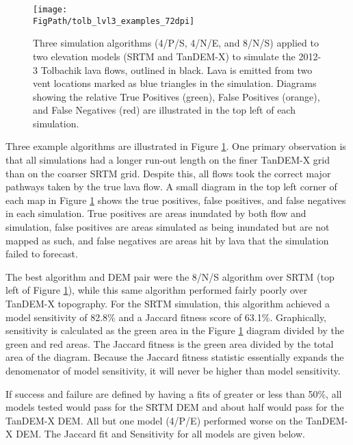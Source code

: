 	\begin{figure}[!h]
			\centering
			\texttt{[image: \\FigPath/tolb\_lvl3\_examples\_72dpi]}
			\caption[Three transition function algorithms simulating the 2012-3 Tolbachik lava flows]{Three simulation algorithms (4/P/S, 4/N/E, and 8/N/S) applied to two elevation models (SRTM and TanDEM-X) to simulate the 2012-3 Tolbachik lava flows, outlined in black. Lava is emitted from two vent locations marked as blue triangles in the simulation. Diagrams showing the relative True Positives (green), False Positives (orange), and False Negatives (red) are illustrated in the top left of each simulation.}
			\label{fig:tolbachik}
		\end{figure}
	
	Three example algorithms are illustrated in Figure \ref{fig:tolbachik}. One primary observation is that all simulations had a longer run-out length on the finer TanDEM-X grid than on the coarser SRTM grid. Despite this, all flows took the correct major pathways taken by the true lava flow. A small diagram in the top left corner of each map in Figure \ref{fig:tolbachik} shows the true positives, false positives, and false negatives in each simulation. True positives are areas inundated by both flow and simulation, false positives are areas simulated as being inundated but are not mapped as such, and false negatives are areas hit by lava that the simulation failed to forecast. 
		
			The best algorithm and DEM pair were the 8/N/S algorithm over SRTM (top left of Figure \ref{fig:tolbachik}), while this same algorithm performed fairly poorly over TanDEM-X topography. For the SRTM simulation, this algorithm achieved a model sensitivity of 82.8\% and a Jaccard fitness score of 63.1\%. Graphically, sensitivity is calculated as the green area in the Figure \ref{fig:tolbachik} diagram divided by the green and red areas. The Jaccard fitness is the green area divided by the total area of the diagram. Because the Jaccard fitness statistic essentially expands the denomenator of model sensitivity, it will never be higher than model sensitivity.
			
			If success and failure are defined by having a fits of greater or less than 50\%, all models tested would pass for the SRTM DEM and about half would pass for the TanDEM-X DEM. All but one model (4/P/E) performed worse on the TanDEM-X DEM. The Jaccard fit and Sensitivity for all models are given below.
					
